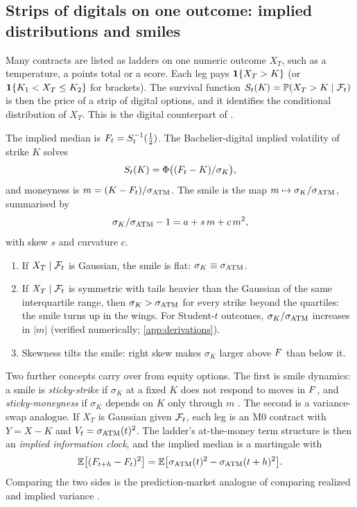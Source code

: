 \subsection{Strips of digitals on one outcome: implied distributions and smiles}\label{sec:model-ladder}

Many contracts are listed as ladders on one numeric outcome $X_T$, such as a temperature, a
points total or a score. Each leg pays $\mathbf{1}\{X_T>K\}$ (or $\mathbf{1}\{K_1<X_T\le K_2\}$ for brackets). The
survival function $S_t(K)=\mathbb{P}(X_T>K\mid\mathcal{F}_t)$ is then the price of a strip of digital options,
and it identifies the conditional distribution of $X_T$. This is the digital counterpart of
\citet{breedenlitzenberger1978}.

\begin{definition}\label{def:smile}
The implied median is $F_t=S_t^{-1}(\tfrac12)$. The Bachelier-digital implied volatility of
strike $K$ solves
\[
  S_t(K)=\Phi\big((F_t-K)/\sigma_K\big),
\]
and moneyness is $m=(K-F_t)/\sigma_{\mathrm{ATM}}$. The smile is the map $m\mapsto\sigma_K/\sigma_{\mathrm{ATM}}$, summarised by
\[
  \sigma_K/\sigma_{\mathrm{ATM}}-1=a+s\,m+c\,m^2 ,
\]
with skew $s$ and curvature $c$.
\end{definition}

\begin{proposition}\label{prop:smile}
\begin{enumerate}
  \item If $X_T\mid\mathcal{F}_t$ is Gaussian, the smile is flat: $\sigma_K\equiv\sigma_{\mathrm{ATM}}$.
  \item If $X_T\mid\mathcal{F}_t$ is symmetric with tails heavier than the Gaussian of the same
  interquartile range, then $\sigma_K>\sigma_{\mathrm{ATM}}$ for every strike beyond the quartiles: the smile turns
  up in the wings. For Student-$t$ outcomes, $\sigma_K/\sigma_{\mathrm{ATM}}$ increases in $|m|$ (verified
  numerically; \cref{app:derivations}).
  \item Skewness tilts the smile: right skew makes $\sigma_K$ larger above $F$ than below it.
\end{enumerate}
\end{proposition}

Two further concepts carry over from equity options. The first is smile dynamics: a smile is
\emph{sticky-strike} if $\sigma_K$ at a fixed $K$ does not respond to moves in $F$, and
\emph{sticky-moneyness} if $\sigma_K$ depends on $K$ only through $m$ \citep{derman1999}. The
second is a variance-swap analogue. If $X_T$ is Gaussian given $\mathcal{F}_t$, each leg is an M0 contract
with $Y=X-K$ and $V_t=\sigma_{\mathrm{ATM}}(t)^2$. The ladder's at-the-money term structure is then an
\emph{implied information clock}, and the implied median is a martingale with
\begin{equation}\label{eq:varswap}
  \mathbb{E}\big[(F_{t+h}-F_t)^2\big]=\mathbb{E}\big[\sigma_{\mathrm{ATM}}(t)^2-\sigma_{\mathrm{ATM}}(t+h)^2\big].
\end{equation}
Comparing the two sides is the prediction-market analogue of comparing realized and implied
variance \citep{carrwu2009,bollerslev2009}.

